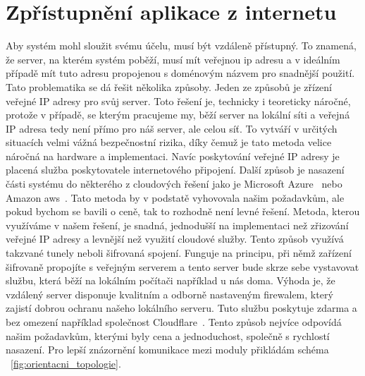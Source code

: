 \section{Zpřístupnění aplikace z internetu}\label{sec:zpristupneni-aplikace-z-internetu}
Aby systém mohl sloužit svému účelu, musí být vzdáleně přístupný.
To znamená, že server, na kterém systém poběží, musí mít veřejnou \gls{ip} adresu a v ideálním případě mít tuto adresu propojenou s doménovým názvem pro snadnější použití.
Tato problematika se dá řešit několika způsoby.\newline
Jeden ze způsobů je zřízení veřejné IP adresy pro svůj server.
Toto řešení je, technicky i teoreticky náročné, protože v případě, se kterým pracujeme my, běží server na lokální síti a veřejná IP adresa tedy není přímo pro náš server, ale celou síť.
To vytváří v určitých situacích velmi vážná bezpečnostní rizika, díky čemuž je tato metoda velice náročná na hardware a implementaci.
Navíc poskytování veřejné IP adresy je placená služba poskytovatele internetového připojení.\newline
Další způsob je nasazení části systému do některého z cloudových řešení jako je Microsoft Azure~\cite{MicrosoftAzure} nebo Amazon \gls{aws}~\cite{AWS}.
Tato metoda by v podstatě vyhovovala našim požadavkům, ale pokud bychom se bavili o ceně, tak to rozhodně není levné řešení. \newline
Metoda, kterou využíváme v našem řešení, je snadná, jednodušší na implementaci než zřizování veřejné IP adresy a levnější než využití cloudové služby.
Tento způsob využívá takzvané tunely neboli šifrovaná spojení.
Funguje na principu, při němž zařízení šifrovaně propojíte s veřejným serverem a tento server bude skrze sebe vystavovat službu, která běží na lokálním počítači například u nás doma.
Výhoda je, že vzdálený server disponuje kvalitním a odborně nastaveným firewalem, který zajistí dobrou ochranu našeho lokálního serveru.
Tuto službu poskytuje zdarma a bez omezení například společnost Cloudflare~\cite{cloudflare}.
Tento způsob nejvíce odpovídá našim požadavkům, kterými byly cena a jednoduchost, společně s rychlostí nasazení.
Pro lepší znázornění komunikace mezi moduly přikládám schéma ~\ref{fig:orientacni_topologie}.

